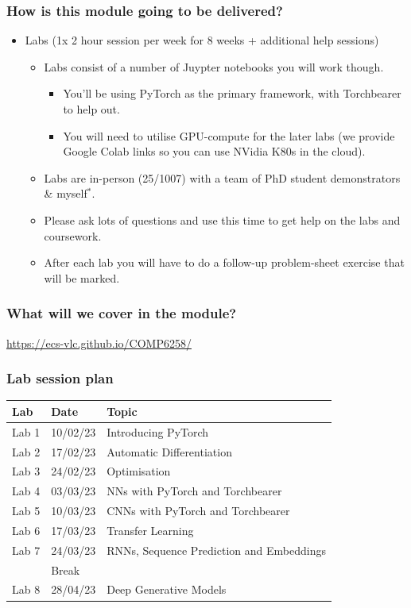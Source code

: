 \documentclass[\beamerclass]{beamer}
\begin{document}
\begin{frame}
	\frametitle{How is this module going to be delivered?}

	\begin{itemize}
		\item<+-> Labs (1x 2 hour session per week for 8 weeks + additional help sessions)
		\begin{itemize}
			\item Labs consist of a number of Juypter notebooks you will work though.
			\begin{itemize}
				\item You'll be using PyTorch as the primary framework, with Torchbearer to help out.
				\item You will need to utilise GPU-compute for the later labs (we provide Google Colab links so you can use NVidia K80s in the cloud).
			\end{itemize}
			\item Labs are in-person (25/1007) with a team of PhD student demonstrators \& myself{$^*$}. 
			\item Please ask lots of questions and use this time to get help on the labs and coursework.
			\item After each lab you will have to do a follow-up problem-sheet exercise that will be marked.
		\end{itemize}
	\end{itemize}
\end{frame}

\begin{frame}
	\frametitle{What will we cover in the module?}
	\url{https://ecs-vlc.github.io/COMP6258/}
\end{frame}

\begin{frame}
	\frametitle{Lab session plan}
	
	\begin{center}
	\begin{tabular}{ l l l }
		 Lab & Date & Topic \\ \hline
		 Lab 1  & 10/02/23 & Introducing PyTorch \\ 
		 Lab 2  & 17/02/23 & Automatic Differentiation \\  
		 Lab 3  & 24/02/23 & Optimisation \\
		 Lab 4  & 03/03/23 & NNs with PyTorch and Torchbearer \\
 		 Lab 5  & 10/03/23 & CNNs with PyTorch and Torchbearer \\
 		 Lab 6  & 17/03/23 & Transfer Learning \\
 		 Lab 7  & 24/03/23 & RNNs, Sequence Prediction and Embeddings \\
 		 \hline
 		 & Break & \\
		 \hline
		 Lab 8  & 28/04/23 & Deep Generative Models \\
	\end{tabular}
	\end{center}
\end{frame}
\end{document}
